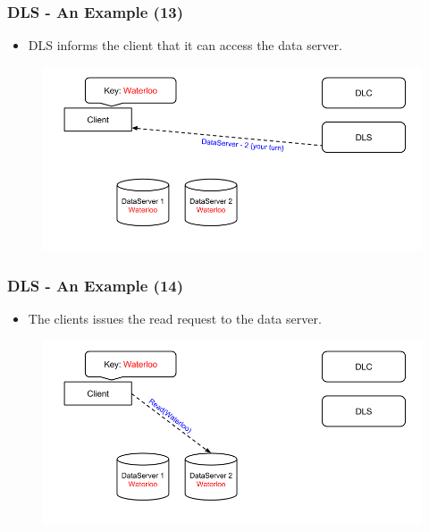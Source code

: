 \documentclass{beamer}
\begin{document}
\begin{frame}
  \frametitle{DLS - An Example (13)}
  \begin{itemize}
  \item DLS informs the client that it can access the data server.
\newline
  \end{itemize}
  \begin{figure}
    \begin{center}
      \centerline{\includegraphics[scale=0.40]{img/DLS_Example07.png}}
    \end{center}
  \end{figure}
\end{frame}

\begin{frame}
  \frametitle{DLS - An Example (14)}
  \begin{itemize}
  \item The clients issues the read request to the data server.
\newline
  \end{itemize}
  \begin{figure}
    \begin{center}
      \centerline{\includegraphics[scale=0.40]{img/DLS_Example08.png}}
    \end{center}
  \end{figure}
\end{frame}
\end{document}
